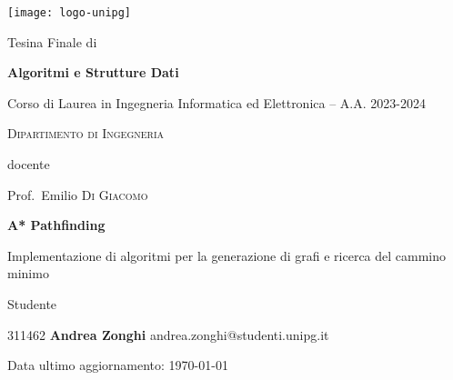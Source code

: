 \documentclass[12pt,a4paper]{report}
\begin{document}
\begin{titlepage}
	\centering
	\texttt{[image: logo-unipg]}\par\vspace{0.5cm}
	\large{Tesina Finale di}\par
	\large{\textbf{Algoritmi e Strutture Dati}}\par
	\small{Corso di Laurea in Ingegneria Informatica ed Elettronica -- A.A. 2023-2024}\par
	\textsc{\small{Dipartimento di Ingegneria}}\par 

	\vspace{0.5cm}
	docente\par
	Prof.~Emilio \textsc{Di Giacomo}

	\vspace{1cm}
	\vspace{1cm}
	\textbf{\huge{A* Pathfinding}}\par
	\vspace{0.2cm}
	Implementazione di algoritmi per la generazione di grafi e ricerca del cammino minimo\par
	\vspace{0.5cm}
	\vspace{1cm}

	\large{Studente}\par
	\vspace{0.5cm}
	\large{311462}
	\large{\textbf{Andrea Zonghi}}
	\large{andrea.zonghi@studenti.unipg.it}\\

	\vfill
	\raggedright
	\small{Data ultimo aggiornamento: \today}
\end{titlepage}
\restoregeometry

\tableofcontents
\end{document}

